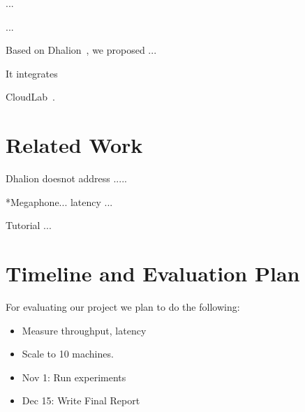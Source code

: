 \documentclass[pdftex,twocolumn,10pt,letterpaper]{article}
\begin{document}
...


...




Based on Dhalion~\cite{}, we proposed ...

It integrates 


CloudLab~\cite{RicciEide:login14}.
 
\section{Related Work}

Dhalion doesnot address .....

*Megaphone... latency ...


Tutorial ...

\section{Timeline and Evaluation Plan}
For evaluating our project we plan to do the following:
\begin{itemize}
  \item Measure throughput, latency 
  \item Scale to 10 machines.
\end{itemize}

\begin{itemize}
  \item Nov 1: Run experiments 
  \item Dec 15: Write Final Report
\end{itemize}

{


}
\end{document}

